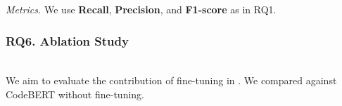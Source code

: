 {\em Metrics.}
We use {\bf Recall}, {\bf Precision}, and {\bf F1-score} as in RQ1.

\subsubsection{RQ6. Ablation Study}~\\
We aim to evaluate the contribution of fine-tuning in {\tool}. We
compared {\tool} against CodeBERT without fine-tuning.
